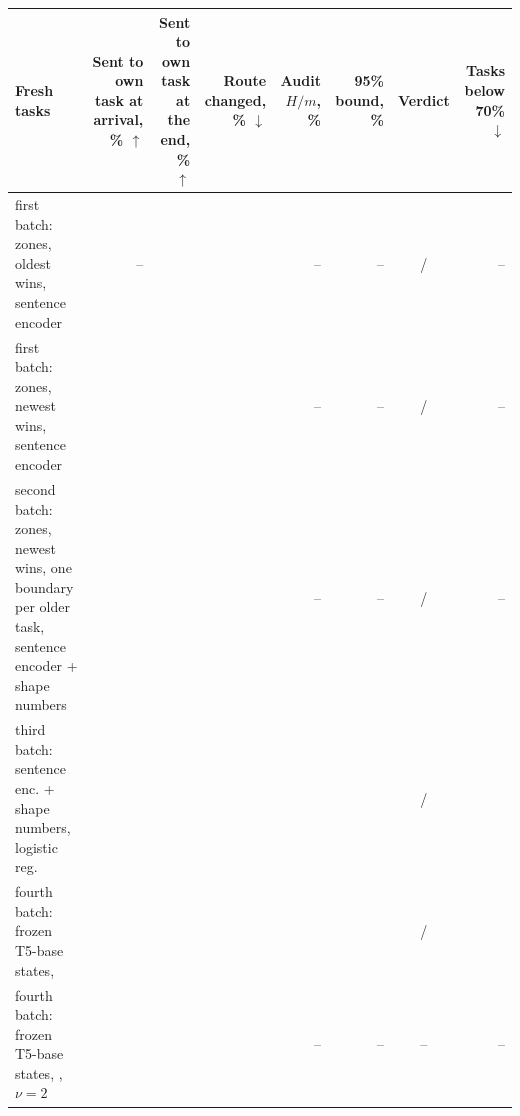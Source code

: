 {\scriptsize\setlength{\tabcolsep}{2pt}\begin{tabular}{p{0.95in}rrrrrcr}
    \toprule
    Fresh tasks & \shortstack[r]{Sent to\\own task\\at arrival,\\\% $\uparrow$} & \shortstack[r]{Sent to\\own task\\at the end,\\\% $\uparrow$} & \shortstack[r]{Route\\changed,\\\% $\downarrow$} & \shortstack[r]{Audit\\$H/m$, \%} & \shortstack[r]{95\% bound,\\\%} & Verdict & \shortstack[r]{Tasks below\\70\% $\downarrow$} \\
    \midrule
    first batch: zones, oldest wins, sentence encoder & -- & \AudShapeFreshFirstOldestEnd{} & \AudShapeFreshFirstOldestChanged{} & -- & -- & \AudShapeFreshFirstOldestUse{} / \AudShapeFreshFirstOldestClaim{} & -- \\
    first batch: zones, newest wins, sentence encoder & \AudShapeFreshFirstNewestArrive{} & \AudShapeFreshFirstNewestEnd{} & \AudShapeFreshFirstNewestChanged{} & -- & -- & \AudShapeFreshFirstNewestUse{} / \AudShapeFreshFirstNewestGuarantee{} & -- \\
    second batch: zones, newest wins, one boundary per older task, sentence encoder + shape numbers & \AudShapeFreshSecondArrive{} & \AudShapeFreshSecondEnd{} & \AudShapeFreshSecondChanged{} & -- & -- & \AudShapeFreshSecondUse{} / \AudShapeFreshSecondGuarantee{} & -- \\
    third batch: sentence enc. + shape numbers, logistic reg. & \AudFreshThirdArrive{} & \AudFreshThirdEnd{} & \AudFreshThirdChanged{} & \AudFreshThirdAuditEst{} & \AudFreshThirdAuditBound{} & \AudFreshThirdUse{} / \AudFreshThirdCert{} & \AudFreshThirdLow{} \\
    fourth batch: frozen T5-base states, \recog{} & \AudFreshFourthLArrive{} & \AudFreshFourthLEnd{} & \AudFreshFourthLChanged{} & \AudFreshFourthAuditEst{} & \AudFreshFourthAuditBound{} & \AudFreshFourthUse{} / \AudFreshFourthCert{} & \AudFreshFourthLow{} \\
    fourth batch: frozen T5-base states, \handicap{}, $\nu = 2$ & \AudFreshFourthHArrive{} & \AudFreshFourthHEnd{} & \AudFreshFourthHChanged{} & -- & -- & -- & -- \\
    \bottomrule
\end{tabular}}
